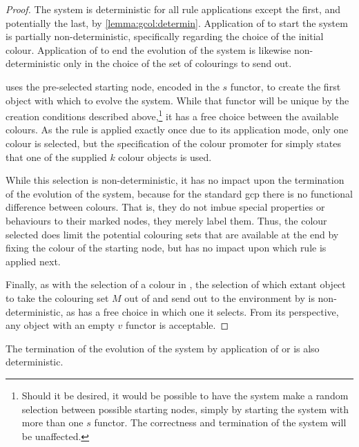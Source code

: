 \begin{proof}
The system is deterministic for all rule applications except the first, and potentially the last, by \cref{lemma:gcol:determin}.  Application of  to start the system is partially non-deterministic, specifically regarding the choice of the initial colour.  Application of  to end the evolution of the system is likewise non-deterministic only in the choice of the set of colourings to send out.

 uses the pre-selected starting node, encoded in the \(s\) \gls{functor}, to create the first \bo{} object with which to evolve the system.  While that \gls{functor} will be unique by the creation conditions described above,\footnote{Should it be desired, it would be possible to have the system make a random selection between possible starting nodes, simply by starting the system with more than one \(s\) \gls{functor}.  The correctness and termination of the system will be unaffected.} it has a free choice between the available colours.  As the rule is applied exactly once due to its application mode, only one colour is selected, but the specification of the colour \gls{promoter} for  simply states that one of the supplied \(k\) colour objects is used.

While this selection is non-deterministic, it has no impact upon the termination of the evolution of the system, because for the standard \gls{gcp} there is no functional difference between colours.  That is, they do not imbue special properties or behaviours to their marked nodes, they merely label them.  Thus, the colour selected does limit the potential colouring sets that are available at the end by fixing the colour of the starting node, but has no impact upon which rule is applied next.

Finally, as with the selection of a colour in , the selection of which extant \bo{} object to take the colouring set \(M\) out of and send out to the environment by  is non-deterministic, as  has a free choice in which one it selects.  From its perspective, any \bo{} object with an empty \(v\) \gls{functor} is acceptable.
\end{proof}

\begin{lemma}\label{lemma:gcol:ending}
The termination of the evolution of the system by application of  or  is also deterministic.
\end{lemma}

